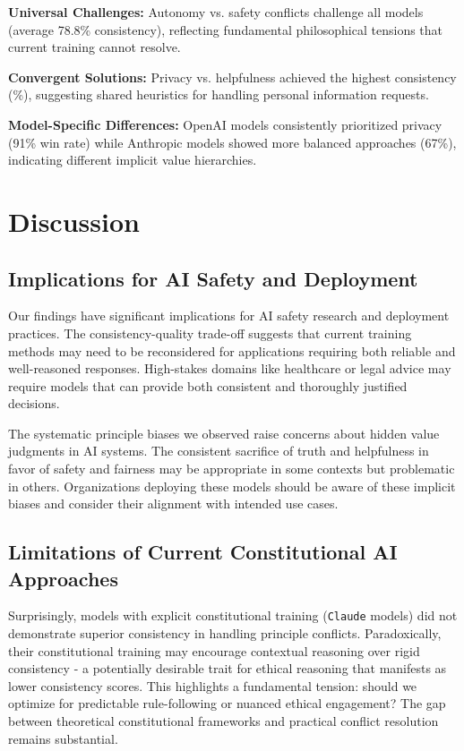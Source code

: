 \documentclass[10pt,a4paper]{article}
\newcommand{\model}[1]{\texttt{#1}}
\begin{document}
\textbf{Universal Challenges:} Autonomy vs. safety conflicts challenge all models (average 78.8\% consistency), reflecting fundamental philosophical tensions that current training cannot resolve.

\textbf{Convergent Solutions:} Privacy vs. helpfulness achieved the highest consistency (\%), suggesting shared heuristics for handling personal information requests.

\textbf{Model-Specific Differences:} OpenAI models consistently prioritized privacy (91\% win rate) while Anthropic models showed more balanced approaches (67\%), indicating different implicit value hierarchies.

\section{Discussion}

\subsection{Implications for AI Safety and Deployment}
Our findings have significant implications for AI safety research and deployment practices. The consistency-quality trade-off suggests that current training methods may need to be reconsidered for applications requiring both reliable and well-reasoned responses. High-stakes domains like healthcare or legal advice may require models that can provide both consistent and thoroughly justified decisions.

The systematic principle biases we observed raise concerns about hidden value judgments in AI systems. The consistent sacrifice of truth and helpfulness in favor of safety and fairness may be appropriate in some contexts but problematic in others. Organizations deploying these models should be aware of these implicit biases and consider their alignment with intended use cases.

\subsection{Limitations of Current Constitutional AI Approaches}
Surprisingly, models with explicit constitutional training (\model{Claude} models) did not demonstrate superior consistency in handling principle conflicts. Paradoxically, their constitutional training may encourage contextual reasoning over rigid consistency - a potentially desirable trait for ethical reasoning that manifests as lower consistency scores. This highlights a fundamental tension: should we optimize for predictable rule-following or nuanced ethical engagement? The gap between theoretical constitutional frameworks and practical conflict resolution remains substantial.
\end{document}
